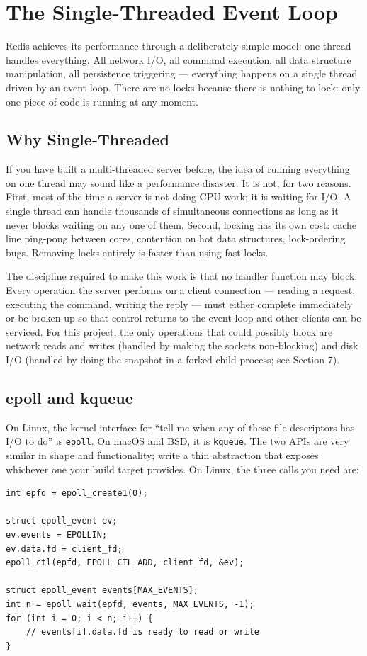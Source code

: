 \documentclass[11pt,a4paper]{article}
\begin{document}
\section{The Single-Threaded Event Loop}

Redis achieves its performance through a deliberately simple model: one thread handles everything. All network I/O, all command execution, all data structure manipulation, all persistence triggering --- everything happens on a single thread driven by an event loop. There are no locks because there is nothing to lock: only one piece of code is running at any moment.

\subsection{Why Single-Threaded}
If you have built a multi-threaded server before, the idea of running everything on one thread may sound like a performance disaster. It is not, for two reasons. First, most of the time a server is not doing CPU work; it is waiting for I/O. A single thread can handle thousands of simultaneous connections as long as it never blocks waiting on any one of them. Second, locking has its own cost: cache line ping-pong between cores, contention on hot data structures, lock-ordering bugs. Removing locks entirely is faster than using fast locks.

The discipline required to make this work is that no handler function may block. Every operation the server performs on a client connection --- reading a request, executing the command, writing the reply --- must either complete immediately or be broken up so that control returns to the event loop and other clients can be serviced. For this project, the only operations that could possibly block are network reads and writes (handled by making the sockets non-blocking) and disk I/O (handled by doing the snapshot in a forked child process; see Section 7).

\subsection{epoll and kqueue}
On Linux, the kernel interface for ``tell me when any of these file descriptors has I/O to do'' is \texttt{epoll}. On macOS and BSD, it is \texttt{kqueue}. The two APIs are very similar in shape and functionality; write a thin abstraction that exposes whichever one your build target provides. On Linux, the three calls you need are:

\begin{codebox}
\begin{lstlisting}
int epfd = epoll_create1(0);

struct epoll_event ev;
ev.events = EPOLLIN;
ev.data.fd = client_fd;
epoll_ctl(epfd, EPOLL_CTL_ADD, client_fd, &ev);

struct epoll_event events[MAX_EVENTS];
int n = epoll_wait(epfd, events, MAX_EVENTS, -1);
for (int i = 0; i < n; i++) {
    // events[i].data.fd is ready to read or write
}
\end{lstlisting}
\end{codebox}
\end{document}
